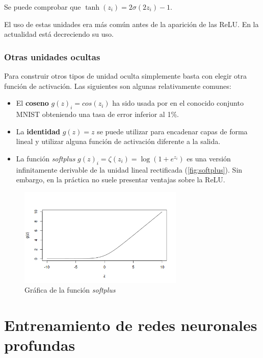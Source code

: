 Se puede comprobar que \(\tanh(z_i)=2\sigma(2z_i)-1\).

El uso de estas unidades era más común antes de la aparición de las
ReLU. En la actualidad está decreciendo su uso.

\subsubsection{Otras unidades ocultas}\label{otras-unidades-ocultas}

Para construir otros tipos de unidad oculta simplemente basta con elegir
otra función de activación. Las siguientes son algunas relativamente
comunes:

\begin{itemize}
\tightlist
\item
  El \textbf{coseno} \(g(z)_i=cos(z_i)\) ha sido usada por
  \textcite{goodfellow2016} en el conocido conjunto MNIST obteniendo una
  tasa de error inferior al 1\%.
\item
  La \textbf{identidad} \(g(z) = z\) se puede utilizar para encadenar
  capas de forma lineal y utilizar alguna función de activación
  diferente a la salida.
\item
  La función \emph{softplus} \(g(z)_i=\zeta(z_i)=\log(1+e^{z_i})\) es
  una versión infinitamente derivable de la unidad lineal rectificada (\autoref{fig:softplus}).
  Sin embargo, en la práctica no suele presentar ventajas sobre la ReLU.
\end{itemize}

\begin{figure}[hbtp]
  \centering
  \includegraphics[width=0.7\textwidth]{images/softplus.png}
  \caption[Softplus]{Gráfica de la función \emph{softplus}}
  \label{fig:softplus}
\end{figure}

\section{Entrenamiento de redes neuronales
profundas}\label{entrenamiento-de-redes-neuronales-profundas}

